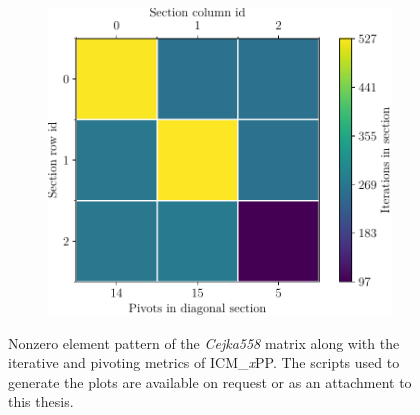 \begin{figure}[ht!]
\begin{subfigure}[t]{0.51\textwidth}
		\includegraphics[width=\textwidth, keepaspectratio, clip]{images/ch03/input-matrices/decomposition-benchmarks/Cejka558_icmxpp_metrics.pdf}
		\label{Figure:comparing-decomposers-and-solvers->decomposition-project-benchmarks->decomposers-benchmark->comparison-of-execution-times-on-subset-of-matrices->ICMxPP-metrics->Cejka558}
	\end{subfigure}
	\caption{Nonzero element pattern of the \textit{Cejka558} matrix along with the iterative and pivoting metrics of ICM\_\textit{x}PP.
		The scripts used to generate the plots are available on request or as an attachment to this thesis.
	}
	\label{Figure:comparing-decomposers-and-solvers->decomposition-project-benchmarks->decomposers-benchmark->comparison-of-execution-times-on-subset-of-matrices->matrix-with-metrics->Cejka558}
\end{figure}

